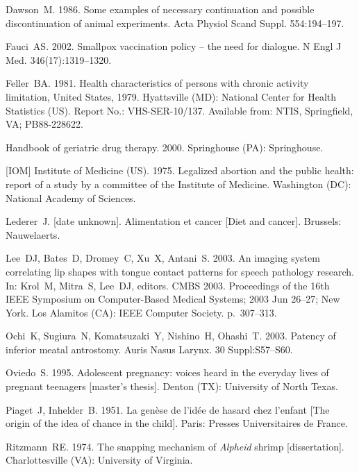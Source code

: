 \documentclass[]{interact}
\theoremstyle{plain}%
\theoremstyle{definition}
\theoremstyle{remark}
\begin{document}
\begin{thebibliography}{}
Dawson~M. 1986. Some examples of necessary continuation and
  possible discontinuation of animal experiments. Acta Physiol Scand Suppl.
  554:194--197.

Fauci~AS. 2002. Smallpox vaccination policy -- the need for dialogue. N Engl J
  Med. 346(17):1319--1320.

Feller~BA. 1981. Health characteristics of persons with chronic activity
  limitation, United States, 1979. Hyattsville (MD): National Center for
  Health Statistics (US). Report No.: VHS-SER-10/137. Available from: NTIS,
  Springfield, VA; PB88-228622.

Handbook of geriatric drug therapy. 2000. Springhouse (PA): Springhouse.

[IOM] Institute of Medicine (US). 1975. Legalized abortion and the public health:
  report of a study by a committee of the Institute of Medicine. Washington
  (DC): National Academy of Sciences.

Lederer~J. {[date unknown]}. Alimentation et cancer [Diet and cancer].
  Brussels: Nauwelaerts.

Lee~DJ, Bates~D, Dromey~C, Xu~X, Antani~S. 2003. An imaging system correlating
  lip shapes with tongue contact patterns for speech pathology research. In:
  Krol~M, Mitra~S, Lee~DJ, editors. CMBS 2003. Proceedings of the 16th IEEE
  Symposium on Computer-Based Medical Systems; 2003 Jun 26--27; New York. Los
  Alamitos (CA): IEEE Computer Society. p.~307--313.

Ochi~K, Sugiura~N, Komatsuzaki~Y, Nishino~H, Ohashi~T. 2003. Patency of
  inferior meatal antrostomy. Auris Nasus Larynx. 30 Suppl:S57--S60.

Oviedo~S. 1995. Adolescent pregnancy: voices heard in the everyday lives of
  pregnant teenagers [master's thesis]. Denton (TX): University of North Texas.

Piaget~J, Inhelder~B. 1951. La gen{\`e}se de l'id{\'e}e de hasard chez l'enfant
  [The origin of the idea of chance in the child]. Paris: Presses
  Universitaires de France.

Ritzmann~RE. 1974. The snapping mechanism of \textit{Alpheid} shrimp
  [dissertation]. Charlottesville (VA): University of Virginia.


\end{thebibliography}
\end{document}
